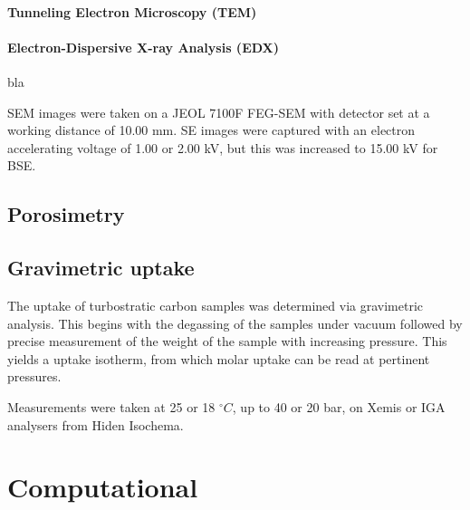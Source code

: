 \paragraph{Tunneling Electron Microscopy (TEM)}

\paragraph{Electron-Dispersive X-ray Analysis (EDX)}
bla


\par SEM images were taken on a JEOL 7100F FEG-SEM with detector set at a working distance of 10.00 mm. SE images were captured with an electron accelerating voltage of 1.00 or 2.00 kV, but this was increased to 15.00 kV for BSE.

\subsection{Porosimetry}

\subsection{Gravimetric  uptake}
The  uptake of turbostratic carbon samples was determined via gravimetric analysis. This begins with the degassing of the samples under vacuum followed by precise measurement of the weight of the sample with increasing  pressure. This yields a  uptake isotherm, from which molar uptake can be read at pertinent pressures.

Measurements were taken at 25 or 18 $^{\circ}C$, up to 40 or 20 bar, on Xemis or IGA analysers from Hiden Isochema. 

\section{Computational}



